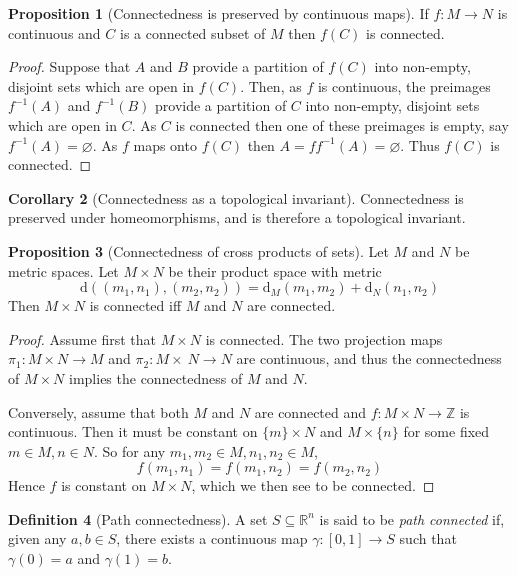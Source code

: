 \documentclass[10pt,fleqn]{article}
\newcommand{\met}{\mathrm{d}}
\newcommand{\reals}{\mathbb{R}}
\theoremstyle{definition} \newtheorem{defn}{Definition}[section]
\theoremstyle{plain}      \newtheorem{thm}[defn]{Theorem}
\theoremstyle{definition} \newtheorem{prop}[defn]{Proposition}
\theoremstyle{definition} \newtheorem{cor}[defn]{Corollary}
\theoremstyle{definition} \newtheorem{ex}[defn]{Example}
\theoremstyle{definition} \newtheorem{rem}[defn]{Remark}
\begin{document}
\begin{prop}[Connectedness is preserved by continuous maps]
    If $f:M\to N$ is continuous and $C$ is a connected subset of $M$ then $f(C)$ is connected.
\end{prop}

\begin{proof}
    Suppose that $A$ and $B$ provide a partition of $f(C)$ into non-empty, disjoint sets which are open in $f(C)$.
    Then, as $f$ is continuous, the preimages $f^{-1}(A)$ and $f^{-1}(B)$ provide a partition of $C$ into non-empty, disjoint sets which are open in $C$.
    As $C$ is connected then one of these preimages is empty, say $f^{-1}(A)=\varnothing$.
    As $f$ maps onto $f(C)$ then $A=ff^{-1}(A)=\varnothing$.
    Thus $f(C)$ is connected.
\end{proof}

\begin{cor}[Connectedness as a topological invariant]
    Connectedness is preserved under homeomorphisms, and is therefore a topological invariant.
\end{cor}

\begin{prop}[Connectedness of cross products of sets]
    Let $M$ and $N$ be metric spaces.
    Let $M\times N$ be their product space with metric
    \[
        \met((m_1,n_1),(m_2,n_2))=\met_M(m_1,m_2)+\met_N(n_1,n_2)
    \]
    Then $M\times N$ is connected iff $M$ and $N$ are connected.
\end{prop}

\begin{proof}
    Assume first that $M\times N$ is connected.
    The two projection maps $\pi_1:M\times N\to M$ and $\pi_2:M\times\ N\to N$ are continuous, and thus the connectedness of $M\times N$ implies the connectedness of $M$ and $N$.

    Conversely, assume that both $M$ and $N$ are connected and $f:M\times N\to\mathbb{Z}$ is continuous.
    Then it must be constant on $\{m\}\times N$ and $M\times\{n\}$ for some fixed $m\in M,n\in N$.
    So for any $m_1,m_2\in M,n_1,n_2\in M$,
    \[
        f(m_1,n_1)=
        f(m_1,n_2)=
        f(m_2,n_2)
    \]
    Hence $f$ is constant on $M\times N$, which we then see to be connected.
\end{proof}

\begin{defn}[Path connectedness]
    A set $S\subseteq\reals^n$ is said to be \emph{path connected} if, given any $a,b\in S$, there exists a continuous map $\gamma:[0,1]\to S$ such that $\gamma(0)=a$ and $\gamma(1)=b$.
\end{defn}
\end{document}
